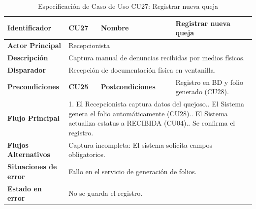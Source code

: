 \begingroup
\setlength{\parskip}{0pt}
\begin{longtable}{|p{3.5cm}|p{2cm}|p{2.5cm}|p{7cm}|}
\caption{Especificación de Caso de Uso CU27: Registrar nueva queja}
\label{tab:cu27_registro} \\
\hline
\textbf{Identificador} & CU27 & \textbf{Nombre} & Registrar nueva queja \\ \hline
\textbf{Actor Principal} & \multicolumn{3}{p{11.5cm}|}{Recepcionista} \\ \hline
\textbf{Descripción} & \multicolumn{3}{p{11.5cm}|}{Captura manual de denuncias recibidas por medios físicos.} \\ \hline
\textbf{Disparador} & \multicolumn{3}{p{11.5cm}|}{Recepción de documentación física en ventanilla.} \\ \hline
\textbf{Precondiciones} & \textbf{CU25} & \textbf{Postcondiciones} & Registro en BD y folio generado (CU28). \\ \hline
\textbf{Flujo Principal} & \multicolumn{3}{p{11.5cm}|}{1. El Recepcionista captura datos del quejoso.\newline 2. El Sistema genera el folio automáticamente (CU28).\newline 3. El Sistema actualiza estatus a RECIBIDA (CU04).\newline 4. Se confirma el registro.} \\ \hline
\textbf{Flujos Alternativos} & \multicolumn{3}{p{11.5cm}|}{Captura incompleta: El sistema solicita campos obligatorios.} \\ \hline
\textbf{Situaciones de error} & \multicolumn{3}{p{11.5cm}|}{Fallo en el servicio de generación de folios.} \\ \hline
\textbf{Estado en error} & \multicolumn{3}{p{11.5cm}|}{No se guarda el registro.} \\ \hline
\end{longtable}
\endgroup

\vspace{0.6cm}

